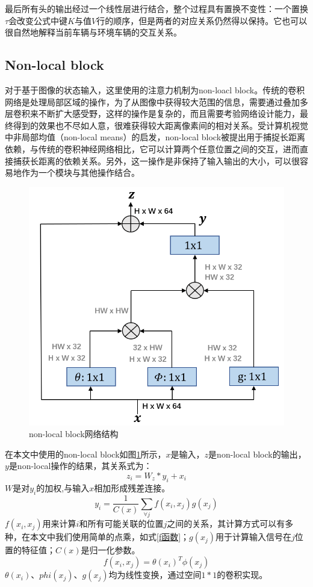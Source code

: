 \documentclass[letterpaper, 10 pt, conference]{ieeeconf}  %
\begin{document}
最后所有头的输出经过一个线性层进行结合，整个过程具有置换不变性：一个置换$\tau$会改变公式中键$K$与值$V$行的顺序，但是两者的对应关系仍然得以保持。它也可以很自然地解释当前车辆与环境车辆的交互关系。

\subsection{Non-local block}
对于基于图像的状态输入，这里使用的注意力机制为non-loacl block\cite{wang2018non}。传统的卷积网络是处理局部区域的操作，为了从图像中获得较大范围的信息，需要通过叠加多层卷积来不断扩大感受野，这样的操作是复杂的，而且需要考验网络设计能力，最终得到的效果也不尽如人意，很难获得较大距离像素间的相对关系。受计算机视觉中非局部均值（non-local means）的启发，non-local block被提出用于捕捉长距离依赖，与传统的卷积神经网络相比，它可以计算两个任意位置之间的交互，进而直接捕获长距离的依赖关系。另外，这一操作是非保持了输入输出的大小，可以很容易地作为一个模块与其他操作结合。

\begin{figure}[htbp]
    \centering
    \includegraphics[width=\linewidth]{fig/non-local细节.png}
    \caption{non-local block网络结构}
    \label{fig:nonlocal block}
  \end{figure}
在本文中使用的non-local block如图\ref{fig:nonlocal block}所示，$x$是输入，$z$是non-local block的输出，$y$是non-local操作的结果，其关系式为：
\begin{equation}
    z_i=W_z*y_i + x_i
\end{equation}
$W$是对$y_i$的加权,与输入$x$相加形成残差连接。
\begin{equation}
    y_i = \frac{1}{C(x)}\sum_{\forall j}f(x_i,x_j)g(x_j)
\end{equation}
$f(x_i,x_j)$用来计算$i$和所有可能关联的位置$j$之间的关系，其计算方式可以有多种，在本文中我们使用简单的点乘，如式\ref{f函数}；$g(x_j)$用于计算输入信号在$j$位置的特征值；$C(x)$是归一化参数。
\begin{equation}\label{f函数}
    f(x_i,x_j)=\theta(x_i)^{T}\phi(x_j)
\end{equation}
$\theta(x_i)$、$phi(x_j)$、$g(x_j)$均为线性变换，通过空间$1*1$的卷积实现。
\end{document}
